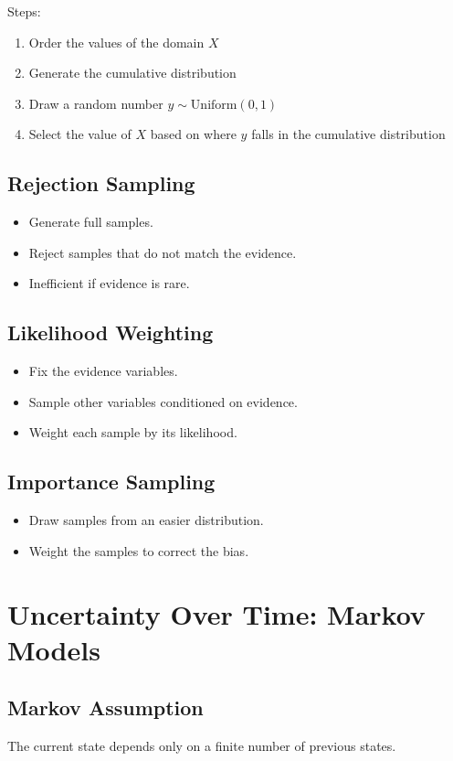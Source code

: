 Steps:
\begin{enumerate}
    \item Order the values of the domain \( X \)
    \item Generate the cumulative distribution
    \item Draw a random number \( y \sim \text{Uniform}(0,1) \)
    \item Select the value of \( X \) based on where \( y \) falls in the cumulative distribution
\end{enumerate}

\subsection*{Rejection Sampling}
\begin{itemize}
    \item Generate full samples.
    \item Reject samples that do not match the evidence.
    \item Inefficient if evidence is rare.
\end{itemize}

\subsection*{Likelihood Weighting}
\begin{itemize}
    \item Fix the evidence variables.
    \item Sample other variables conditioned on evidence.
    \item Weight each sample by its likelihood.
\end{itemize}

\subsection*{Importance Sampling}
\begin{itemize}
    \item Draw samples from an easier distribution.
    \item Weight the samples to correct the bias.
\end{itemize}

\section{Uncertainty Over Time: Markov Models}

\subsection*{Markov Assumption}
The current state depends only on a finite number of previous states.


